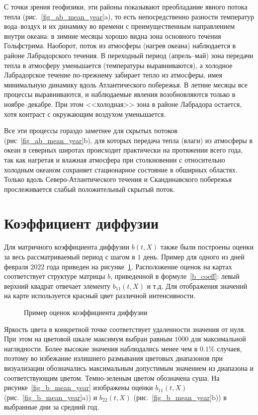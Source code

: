 С точки зрения геофизики, эти районы показывают преобладание явного потока тепла (рис.~\ref{fig_ab_mean_year}a), то есть непосредственно разности температур вода--воздух и их динамику во времени с преимущественным направлением внутри океана: в зимние месяцы хорошо видна зона основного течения Гольфстрима. Наоборот, поток из атмосферы (нагрев океана) наблюдается в районе Лабрадорского течения. В переходный период (апрель--май) зона передачи тепла в атмосферу уменьшается (температуры выравниваются), а холодное Лабрадорское течение по-прежнему забирает тепло из атмосферы, имея минимальную динамику вдоль Атлантического побережья. В летние месяцы все процессы выравниваются, и наблюдаемые явления возобновляются только в ноябре--декабре. При этом <<холодная>> зона в районе Лабрадора остается, хотя контраст с окружающим воздухом уменьшается.

Все эти процессы гораздо заметнее для скрытых потоков (рис~\ref{fig_ab_mean_year}b), для которых передача тепла (влаги) из атмосферы в океан в северных широтах происходит практически на протяжении всего года, так как нагретая и влажная атмосфера при столкновении с относительно холодным океаном сохраняет стационарное состояние в обширных областях. Только вдоль Северо-Атлантического течения и Скандинавского побережья прослеживается слабый положительный скрытый поток. 

\section{Коэффициент диффузии}
Для матричного коэффициента диффузии $b(t,X)$ также были построены оценки за весь рассматриваемый период с шагом в $1$ день. Пример для одного из дней февраля $2022$ года приведен на рисунке~\ref{fig_b_example}. Расположение оценок на картах соответствует структуре матрицы $b$, приведенной в формуле~\eqref{b_coeff}: левый верхний квадрат отвечает элементу $b_{11}(t,X)$ и т.д. Для отображения значений на карте используется красный цвет различной интенсивности.

\begin{figure}[h!]
	\center{\texttt{[image: B\_15742]}}
	\caption{Пример оценок коэффициента диффузии} \label{fig_b_example}
\end{figure}

Яркость цвета в конкретной точке соответствует удаленности значения от нуля. При этом на цветовой шкале максимум выбран равным $1000$ для максимальной наглядности. Более высокие значения наблюдались менее чем в $0.1\%$ случаев, поэтому во избежание излишнего размывания цветовых диапазонов при визуализации обозначались максимальным допустимым значением из диапазона и соответствующим цветом. Темно-зеленым цветом обозначена суша. На рисунке~\ref{fig_b_mean_year} изображены оценки $b_{11}(t,X)$ (рис.~\ref{fig_b_mean_year}a)) и $b_{22}(t,X)$ (рис.~\ref{fig_b_mean_year}b)) в выбранные дни за средний год.


